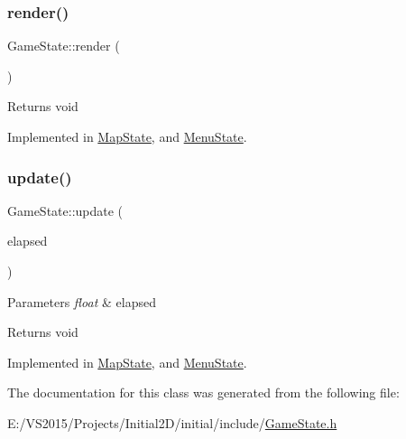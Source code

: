 \mbox{\label{class_game_state_ade2f8ae5aa83f8709863437a8ffba12c}} 
\subsubsection{\texorpdfstring{render()}{render()}}
{\footnotesize\ttfamily Game\+State\+::render (\begin{DoxyParamCaption}{ }\end{DoxyParamCaption})\hspace{0.3cm}{\ttfamily [pure virtual]}}

\begin{DoxyReturn}{Returns}
void 
\end{DoxyReturn}


Implemented in \mbox{\hyperlink{class_map_state_a6e06116bc2372a7e0939bb129ea66a3e}{Map\+State}}, and \mbox{\hyperlink{class_menu_state_ac216e0b4c7f5c5d39520165c45af0da6}{Menu\+State}}.

\mbox{\label{class_game_state_acdace458d1c5a39fdb3bca0d65f88d7d}} 
\subsubsection{\texorpdfstring{update()}{update()}}
{\footnotesize\ttfamily Game\+State\+::update (\begin{DoxyParamCaption}\item[{float}]{elapsed }\end{DoxyParamCaption})\hspace{0.3cm}{\ttfamily [pure virtual]}}


\begin{DoxyParams}{Parameters}
{\em float} & elapsed \\
\hline
\end{DoxyParams}
\begin{DoxyReturn}{Returns}
void 
\end{DoxyReturn}


Implemented in \mbox{\hyperlink{class_map_state_afeafeea186395c2d4c5ce5c4936b9855}{Map\+State}}, and \mbox{\hyperlink{class_menu_state_ace168c6eaa32fd90e1e09828f46bcfbf}{Menu\+State}}.



The documentation for this class was generated from the following file\+:\begin{DoxyCompactItemize}
\item 
E\+:/\+V\+S2015/\+Projects/\+Initial2\+D/initial/include/\mbox{\hyperlink{_game_state_8h}{Game\+State.\+h}}\end{DoxyCompactItemize}
